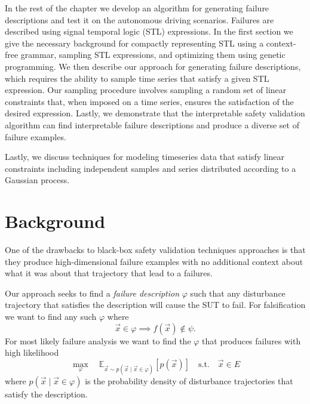 In the rest of the chapter we develop an algorithm for generating failure descriptions and test it on the autonomous driving scenarios. Failures are described using signal temporal logic (STL) expressions. In the first section we give the necessary background for compactly representing STL using a context-free grammar, sampling STL expressions, and optimizing them using genetic programming. We then describe our approach for generating failure descriptions, which requires the ability to sample time series that satisfy a given STL expression. Our sampling procedure involves sampling a random set of linear constraints that, when imposed on a time series, ensures the satisfaction of the desired expression. Lastly, we demonstrate that the interpretable safety validation algorithm can find interpretable failure descriptions and produce a diverse set of failure examples. 

Lastly, we discuss techniques for modeling timeseries data that satisfy linear constraints including independent samples and series distributed according to a Gaussian process. 

\section{Background}

One of the drawbacks to black-box safety validation techniques approaches is that they produce high-dimensional failure examples with no additional context about what it was about that trajectory that lead to a failures. 

Our approach seeks to find a \emph{failure description} $\varphi$ such that any disturbance trajectory that satisfies the description will cause the SUT to fail. For falsification we want to find any such $\varphi$ where
\begin{equation}
    \vec{x} \in \varphi \implies f(\vec{x}) \not \in \psi \text{.}
\end{equation}
For most likely failure analysis we want to find the $\varphi$ that produces failures with high likelihood
\begin{equation}
\max_\varphi \quad \mathbb{E}_{\vec{x} \sim p(\vec{x} \mid \vec{x} \in \varphi)}[p(\vec{x})] \quad\textrm{s.t.}\quad \vec{x} \in E
\end{equation}
where $p(\vec{x} \mid \vec{x} \in \varphi)$ is the probability density of disturbance trajectories that satisfy the description. 

